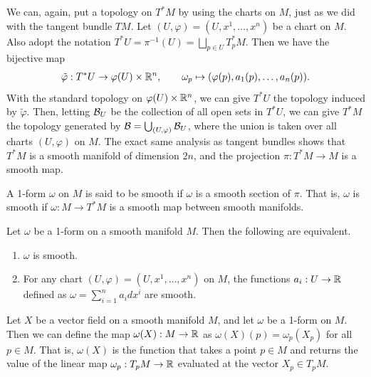 We can, again, put a topology on $T^{\ast}M$ by using the charts on $M$, just as we did with the tangent bundle $TM$. Let $(U,\varphi) = (U,x^{1},\ldots,x^{n})$ be a chart on $M$. Also adopt the notation $T^{\ast}U = \pi^{-1}(U) = \bigsqcup_{p \in U} T^{\ast}_{p}M$. Then we have the bijective map
\begin{align}
    \tilde{\varphi}:T^{\ast}U \to \varphi(U) \times \mathbb{R}^{n}, \qquad \omega_{p} \mapsto (\varphi(p),a_{1}(p),\ldots,a_{n}(p)).
\end{align}
With the standard topology on $\varphi(U) \times \mathbb{R}^{n}$, we can give $T^{\ast}U$ the topology induced by $\tilde{\varphi}$. Then, letting $\mathcal{B}_{U}$ be the collection of all open sets in $T^{\ast}U$, we can give $T^{\ast}M$ the topology generated by $\mathcal{B} = \bigcup_{(U,\varphi)} \mathcal{B}_{U}$, where the union is taken over all charts $(U,\varphi)$ on $M$. The exact same analysis as tangent bundles shows that $T^{\ast}M$ is a smooth manifold of dimension $2n$, and the projection $\pi:T^{\ast}M \to M$ is a smooth map.

A 1-form $\omega$ on $M$ is said to be smooth if $\omega$ is a smooth section of $\pi$. That is, $\omega$ is smooth if $\omega:M \to T^{\ast}M$ is a smooth map between smooth manifolds.

\begin{proposition}
    Let $\omega$ be a 1-form on a smooth manifold $M$. Then the following are equivalent.
    \begin{enumerate}
        \item $\omega$ is smooth.
        \item For any chart $(U,\varphi) = (U,x^{1},\ldots,x^{n})$ on $M$, the functions $a_{i}:U \to \mathbb{R}$ defined as $\omega = \sum_{i=1}^{n} a_{i} dx^{i}$ are smooth.
    \end{enumerate}
\end{proposition}

Let $X$ be a vector field on a smooth manifold $M$, and let $\omega$ be a 1-form on $M$. Then we can define the map $\omega(X):M \to \mathbb{R}$ as $\omega(X)(p) = \omega_{p}(X_{p})$ for all $p \in M$. That is, $\omega(X)$ is the function that takes a point $p \in M$ and returns the value of the linear map $\omega_{p}:T_{p}M \to \mathbb{R}$ evaluated at the vector $X_{p} \in T_{p}M$.


